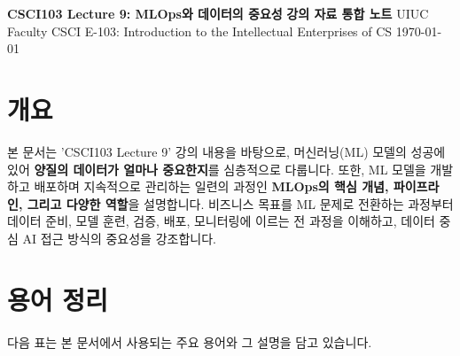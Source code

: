 \documentclass[11pt,a4paper]{article}
\begin{document}
\begin{titlepage}
    \centering
    \vspace*{1cm}
    {\Huge\textbf{CSCI103 Lecture 9: MLOps와 데이터의 중요성}}
    \vspace{1cm}
    {\Large\textbf{강의 자료 통합 노트}}
    \vspace{2cm}
    {\Large UIUC Faculty}
    \vspace{1cm}
    {\large CSCI E-103: Introduction to the Intellectual Enterprises of CS}
    \vfill
    {\small \today}
\end{titlepage}

\newpage
\tableofcontents
\newpage

\section{개요}

\begin{summarybox}
본 문서는 'CSCI103 Lecture 9' 강의 내용을 바탕으로, 머신러닝(ML) 모델의 성공에 있어 \textbf{양질의 데이터가 얼마나 중요한지}를 심층적으로 다룹니다. 또한, ML 모델을 개발하고 배포하며 지속적으로 관리하는 일련의 과정인 \textbf{MLOps의 핵심 개념, 파이프라인, 그리고 다양한 역할}을 설명합니다. 비즈니스 목표를 ML 문제로 전환하는 과정부터 데이터 준비, 모델 훈련, 검증, 배포, 모니터링에 이르는 전 과정을 이해하고, 데이터 중심 AI 접근 방식의 중요성을 강조합니다.
\end{summarybox}

\newpage
\section{용어 정리}

다음 표는 본 문서에서 사용되는 주요 용어와 그 설명을 담고 있습니다.
\end{document}

